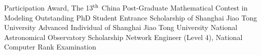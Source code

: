 \documentclass{resume}
\begin{document}
\begin{entries}
    {Participation Award,
      The 13$^{\rm th}$ China Post-Graduate Mathematical Contest in Modeling}
    {Outstanding PhD Student Entrance Scholarship of Shanghai Jiao Tong University}
    {Advanced Individual of Shanghai Jiao Tong University}
    {National Astronomical Observatory Scholarship}
    {Network Engineer (Level 4), National Computer Rank Examination}
\end{entries}
\end{document}
